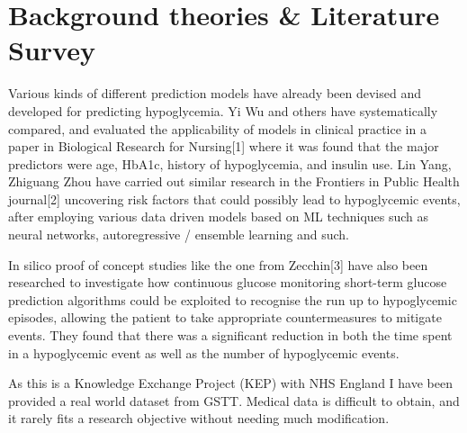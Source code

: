 
\section{Background theories \& Literature Survey} 

\begin{flushleft}
Various kinds of different prediction models have already been devised and developed for predicting hypoglycemia. Yi Wu and others have systematically compared, and evaluated the applicability of models in clinical practice in a paper in Biological Research for Nursing[1] 
where it was found that the major predictors were age, HbA1c, history of hypoglycemia, and insulin use. Lin Yang, Zhiguang Zhou have carried out similar research in the Frontiers in Public Health journal[2] uncovering risk factors that could possibly lead to hypoglycemic 
events, after employing various data driven models based on ML techniques such as neural networks, autoregressive / ensemble learning and such. \\ \vspace{5pt}

In silico proof of concept studies like the one from Zecchin[3] have also been researched to investigate how continuous glucose monitoring short-term glucose prediction algorithms could be exploited to recognise the run up to hypoglycemic episodes, allowing the patient to 
take appropriate countermeasures to mitigate events. They found that there was a significant reduction in both the time spent in a hypoglycemic event as well as the number 
of hypoglycemic events. \\ \vspace{5pt}

As this is a Knowledge Exchange Project (KEP) with NHS England I have been provided a real world dataset from GSTT. Medical data is difficult to obtain, and it rarely fits a research objective without needing much modification. 


\end{flushleft}